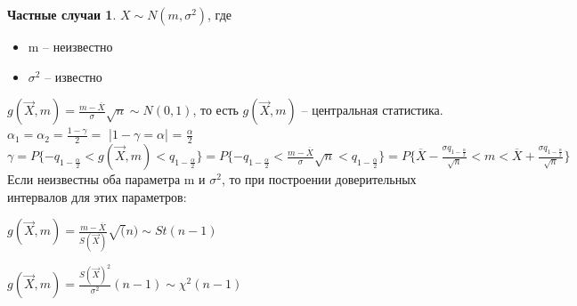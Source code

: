 \documentclass[a4paper, 12pt]{article}
\theoremstyle{definition}
\theoremstyle{leads}
\theoremstyle{example}
\begin{document}
\newtheorem*{algo2}{Частные случаи}
\begin{algo2}
	$X \sim N(m, \sigma^2)$, где 
	\begin{itemize}
		\item m -- неизвестно
		\item $\sigma^2$ -- известно
	\end{itemize}
$g(\vec{X}, m) = \frac{m - \overline{X}}{\sigma} \sqrt{n} \sim N(0,1)$, то есть $g(\vec{X}, m)$ --  центральная статистика.\\
$\alpha_1 = \alpha_2 = \frac{1 - \gamma}{2} = $ |$1 - \gamma = \alpha$| = $\frac{\alpha}{2}$\\
$\gamma = P\{-q_{1 - \frac{\alpha}{2}} < g(\vec{X}, m) < q_{1 - \frac{\alpha}{2}}\} = P\{-q_{1 - \frac{\alpha}{2}} < \frac{m - \overline{X}}{\sigma} \sqrt{n} < q_{1 - \frac{\alpha}{2}} \} = P\{\overline{X} - \frac{\sigma q_{1 - \frac{\alpha}{2}}}{\sqrt{n}} < m < \overline{X} + \frac{\sigma q_{1 - \frac{\alpha}{2}}}{\sqrt{n}}\}$\\
Если неизвестны оба параметра  m и $\sigma^2$, то при построении доверительных интервалов для этих параметров:
 \begin{center}
 	\item $g(\vec{X}, m) = \frac{m - \overline{X}}{S(\vec{X})} \sqrt(n) \sim St(n - 1)$
 	\item $g(\vec{X}, m) = \frac{S(\vec{X})^2}{\sigma^2}(n - 1) \sim \chi^2(n - 1)$ 
 \end{center}
\end{algo2}
\end{document}
